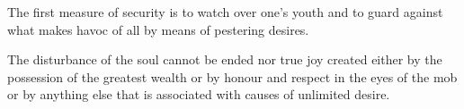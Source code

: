 \documentclass{stex}
\begin{document}
\vspace{0.5em}
\begin{sparagraph}[title=80]
  The first measure of security is to watch over one’s youth and to guard against what makes havoc of all by means of pestering desires.
\end{sparagraph}

\vspace{0.5em}
\begin{sparagraph}[title=81]
  The disturbance of the soul cannot be ended nor true joy created either by the possession of the greatest wealth or by honour and respect in the eyes of the mob or by anything else that is associated with causes of unlimited desire.
\end{sparagraph}
\end{document}
